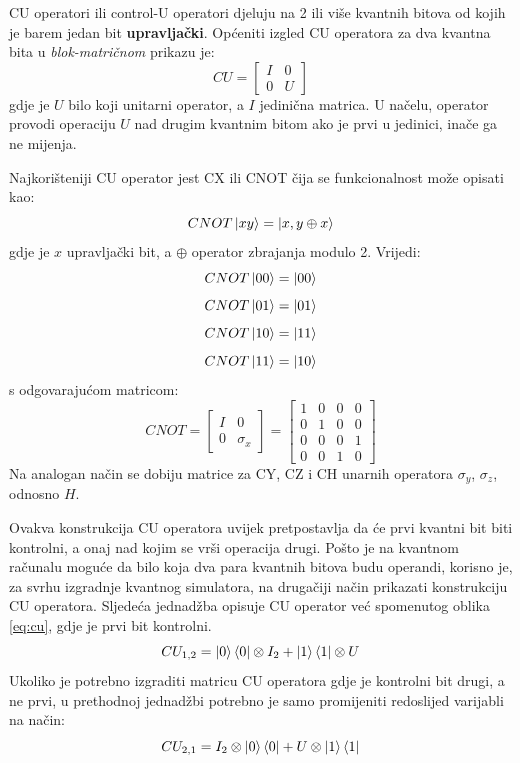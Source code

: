 CU operatori ili control-U operatori djeluju na 2 ili više kvantnih bitova od kojih je barem jedan bit \textbf{upravljački}. Općeniti izgled CU operatora za dva kvantna bita u \emph{blok-matričnom} prikazu je:
\begin{equation}
CU = \begin{bmatrix}
I & 0 \\ 0 & U
\end{bmatrix}
\label{eq:cu}
\end{equation}
gdje je $U$ bilo koji unitarni operator, a $I$ jedinična matrica. U načelu, operator provodi operaciju $U$ nad drugim kvantnim bitom ako je prvi u jedinici, inače ga ne mijenja.

Najkorišteniji CU operator jest CX ili CNOT čija se funkcionalnost može opisati kao:
\[
CNOT\ket{xy} = \ket{x, y\oplus x}
\]
gdje je $x$ upravljački bit, a $\oplus$ operator zbrajanja modulo 2. Vrijedi:
\[CNOT\ket{00} = \ket{00}\]
\[CNOT\ket{01} = \ket{01}\]
\[CNOT\ket{10} = \ket{11}\]
\[CNOT\ket{11} = \ket{10}\]
s odgovarajućom matricom:
\[
CNOT = \begin{bmatrix}
I & 0 \\ 0 & \sigma_x
\end{bmatrix} =
\begin{bmatrix}
1 & 0 & 0 & 0 \\ 0 & 1 & 0 & 0 \\ 0 & 0 & 0 & 1 \\ 0 & 0 & 1 & 0
\end{bmatrix}
\]
Na analogan način se dobiju matrice za CY, CZ i CH unarnih operatora $\sigma_y$, $\sigma_z$, odnosno $H$.

Ovakva konstrukcija CU operatora uvijek pretpostavlja da će prvi kvantni bit biti kontrolni, a onaj nad kojim se vrši operacija drugi. Pošto je na kvantnom računalu moguće da bilo koja dva para kvantnih bitova budu operandi, korisno je, za svrhu izgradnje kvantnog simulatora, na drugačiji način prikazati konstrukciju CU operatora. Sljedeća jednadžba opisuje CU operator već spomenutog oblika \ref{eq:cu}, gdje je prvi bit kontrolni.
\[
CU_{1,2} = \ket{0}\bra{0} \otimes I_2 + \ket{1}\bra{1} \otimes U
\]
Ukoliko je potrebno izgraditi matricu CU operatora gdje je kontrolni bit drugi, a ne prvi, u prethodnoj jednadžbi potrebno je samo promijeniti redoslijed varijabli na način:
\[
CU_{2,1} = I_2  \otimes \ket{0}\bra{0} + U \otimes \ket{1}\bra{1}
\]


